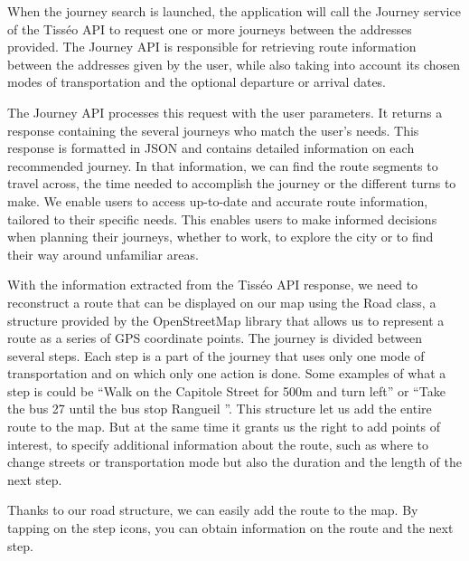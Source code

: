 When the journey search is launched, the application will call the Journey service of the Tisséo API to request one or more journeys between the addresses provided. The Journey API is responsible for retrieving route information between the addresses given by the user, while also taking into account its chosen modes of transportation and the optional departure or arrival dates.



The Journey API processes this request with the user parameters. It returns a response containing the several journeys who match the user's needs. This response is formatted in JSON and contains detailed information on each recommended journey. In that information, we can find the route segments to travel across, the time needed to accomplish the journey or the different turns to make. We enable users to access up-to-date and accurate route information, tailored to their specific needs. This enables users to make informed decisions when planning their journeys, whether to work, to explore the city or to find their way around unfamiliar areas.



With the information extracted from the Tisséo API response, we need to reconstruct a route that can be displayed on our map using the Road class, a structure provided by the OpenStreetMap library that allows us to represent a route as a series of GPS coordinate points. The journey is divided between several steps. Each step is a part of the journey that uses only one mode of transportation and on which only one action is done. Some examples of what a step is could be “Walk on the Capitole Street for 500m and turn left” or “Take the bus 27 until the bus stop Rangueil ''. This structure let us add the entire route to the map. But at the same time it grants us the right to add points of interest, to specify additional information about the route, such as where to change streets or transportation mode but also the duration and the length of the next step.



Thanks to our road structure, we can easily add the route to the map. By tapping on the step icons, you can obtain information on the route and the next step.



